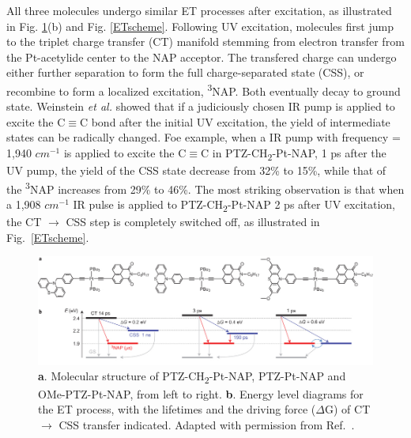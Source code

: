 All three molecules undergo similar ET processes after excitation, as illustrated in Fig. \ref{JuliaStruct}(b) and Fig. \ref{ETscheme}. Following UV excitation, molecules first jump to the triplet charge transfer (CT) manifold stemming from electron transfer from the Pt-acetylide center to the NAP acceptor. The transfered charge can undergo either further separation to form the full charge-separated state (CSS), or recombine to form a localized excitation, \textsuperscript{3}NAP. Both eventually decay to ground state. Weinstein {\em et al.} showed that if a judiciously chosen IR pump is applied to excite the C$\equiv$C bond after the initial UV excitation, the yield of intermediate states can be radically changed. Foe example, when a IR pump with frequency = 1,940 $cm^{-1}$ is applied to excite the C$\equiv$C in PTZ-CH\textsubscript{2}-Pt-NAP, 1 ps after the UV pump, the yield of the CSS state decrease from 32\% to 15\%, while that of the \textsuperscript{3}NAP increases from 29\% to 46\%. The most striking observation is that when a 1,908 $cm^{-1}$ IR pulse is applied to PTZ-CH\textsubscript{2}-Pt-NAP 2 ps after UV excitation, the CT $\rightarrow$ CSS step is completely switched off, as illustrated in Fig.~\ref{ETscheme}.


\begin{figure}[!t]
\includegraphics[width=\columnwidth]{Chapters/chap4/Images/molecules.jpg}
\caption{\textbf{a}. Molecular structure of PTZ-CH\textsubscript{2}-Pt-NAP, PTZ-Pt-NAP and OMe-PTZ-Pt-NAP, from left to right. \textbf{b}. Energy level diagrams for the ET process, with the lifetimes and the driving force ($\Delta$G) of CT $\rightarrow$ CSS transfer  indicated. Adapted with permission from Ref.~\cite{delor2015mechanism}.\label{JuliaStruct}}
\end{figure}

